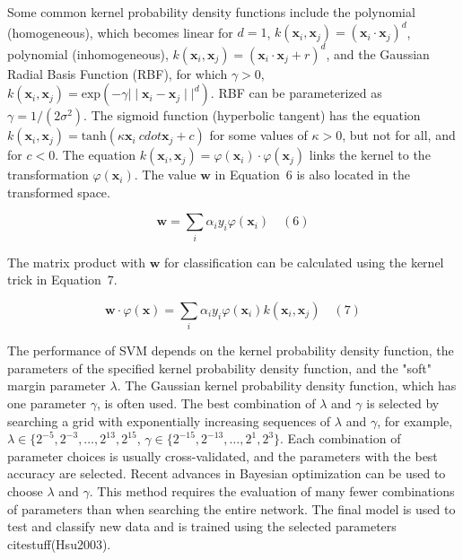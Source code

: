 \documentclass[preprint,12pt]{elsarticle}
\begin{document}
Some common kernel probability density functions include the polynomial (homogeneous), which becomes linear for $d=1$, $k(\mathbf{x}_{i}, \mathbf{x}_{j}) = {(\mathbf{x}_{i} \cdot \mathbf{x}_{j})}^{d}$, polynomial (inhomogeneous), $k(\mathbf{x}_{i}, \mathbf{x}_{j}) = {(\mathbf{x}_{i} \cdot \mathbf{x}_{j} + r)}^{d}$, and the Gaussian Radial Basis Function (RBF), for which $\gamma > 0$, $k(\mathbf{x}_{i}, \mathbf{x}_{j}) = \mathrm{exp}(- \gamma{\mid \mid \mathbf{x}_{i} - \mathbf{x}_{j} \mid \mid}^{d})$. RBF can be parameterized as $\gamma = 1 / (2{\sigma}^{2})$. The sigmoid function (hyperbolic tangent) has the equation $k(\mathbf{x}_{i}, \mathbf{x}_{j}) = \mathrm{tanh}(\kappa \mathbf{x}_{i} \ cdot \mathbf{x}_{j} + c)$ for some values of $\kappa > 0$, but not for all, and for $c < 0$. The equation $k(\mathbf{x}_{i}, \mathbf{x}_{j}) = \varphi(\mathbf{x}_{i}) \cdot \varphi(\mathbf{x}_{j})$ links the kernel to the transformation $\varphi(\mathbf{x}_{i})$. The value $\mathbf{w}$ in Equation~6 is also located in the transformed space.

\begin{equation}
	\mathbf{w} = \sum_{i} \alpha_{i}y_{i}\varphi(\mathbf{x}_{i} )
	\quad\left(6\right)
\end{equation}

The matrix product with $\mathbf{w}$ for classification can be calculated using the kernel trick in Equation~7.

\begin{equation}
	\mathbf{w} \cdot \varphi(\mathbf{x}) = \sum_{i} \alpha_{i}y_{i}\varphi (\mathbf{x}_{i}) k(\mathbf{x}_{i}, \mathbf{x}_{j})
	\quad\left(7\right)
\end{equation}

The performance of SVM depends on the kernel probability density function, the parameters of the specified kernel probability density function, and the "soft" margin parameter $\lambda$. The Gaussian kernel probability density function, which has one parameter $\gamma$, is often used. The best combination of $\lambda$ and $\gamma$ is selected by searching a grid with exponentially increasing sequences of $\lambda$ and $\gamma$, for example, $\lambda \in \{2^{-5},2^{-3},\dots,2^{13},2^{15}$, $\gamma \in \{2^{-15},2^{-13},\dots,2^{1}, 2^{3}\}$. Each combination of parameter choices is usually cross-validated, and the parameters with the best accuracy are selected. Recent advances in Bayesian optimization can be used to choose $\lambda$ and $\gamma$. This method requires the evaluation of many fewer combinations of parameters than when searching the entire network. The final model is used to test and classify new data and is trained using the selected parameters citestuff(Hsu2003).
\end{document}
